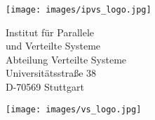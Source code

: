 \begin{titlepage}
\vfill

\begin{figure}[h]
\centering
\begin{minipage}{0.2\textwidth}
\texttt{[image: images/ipvs\_logo.jpg]}
\end{minipage}
\begin{minipage}{0.4\textwidth}
\begin{center}
Institut f\"ur Parallele\\
und Verteilte Systeme\\
Abteilung Verteilte Systeme\\
Universit\"atsstra{\ss}e 38\\
D-70569 Stuttgart
\end{center}
\end{minipage}
\begin{minipage}{0.2\textwidth}
\texttt{[image: images/vs\_logo.jpg]}
\end{minipage}
\end{figure}

\end{titlepage}
